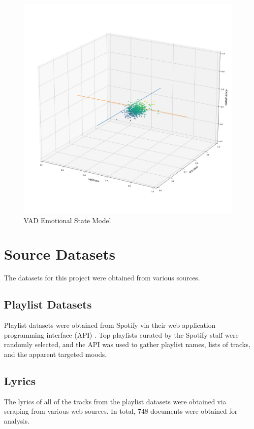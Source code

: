 \documentclass[11pt]{article}
\begin{document}
\begin{figure}[!ht]
  \includegraphics[scale=0.35]{../statics/vad.png}
  \centering
  \caption{VAD Emotional State Model}
  \label{fig:va}
\end{figure}

\section{Source Datasets}

The datasets for this project were obtained from various sources.

\subsection{Playlist Datasets}

Playlist datasets were obtained from Spotify via their web application programming interface (API) \cite{spotify}. Top playlists curated by the Spotify staff were randomly selected, and the API was used to gather playlist names, lists of tracks, and the apparent targeted moods.

\subsection{Lyrics}

The lyrics of all of the tracks from the playlist datasets were obtained via scraping from various web sources. In total, 748 documents were obtained for analysis.
\end{document}
